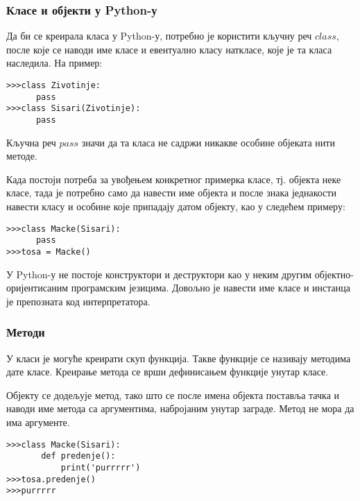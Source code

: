 \subsubsection{Класе и објекти у Python-у}

Да би се креирала класа у Python-у, потребно је користити кључну реч $class$, после које се наводи име класе и евентуално класу наткласе, које је та класа наследила. На пример:

\begin{lstlisting}[caption=Дефинисање класа, label=class]
>>>class Zivotinje:
      pass
>>>class Sisari(Zivotinje):
      pass
\end{lstlisting}

Кључна реч $pass$ значи да та класа не садржи никакве особине објеката нити методе.

Када постоји потреба за увођењем конкретног примерка класе, тј. објекта неке класе, тада је потребно само да навести име објекта и после знака једнакости навести класу и особине које припадају датом објекту, као у следећем примеру:

\begin{lstlisting}[caption=Креирање објекта, label=objects]
>>>class Macke(Sisari):
      pass
>>>tosa = Macke()
\end{lstlisting}

У Python-у не постоје конструктори и деструктори као у неким другим објектно- оријентисаним програмским језицима. Довољно је навести име класе и инстанца је препозната код интерпретатора.

\subsubsection{Методи}

У класи је могуће креирати скуп функција. Такве функције се називају методима дате класе. Креирање метода се врши дефинисањем функције унутар класе.

Објекту се додељује метод, тако што се после имена објекта поставља тачка и наводи име метода са аргументима, набројаним унутар заграде. Метод не мора да има аргументе.

\begin{lstlisting}[caption= Методи класе, label=method]
>>>class Macke(Sisari):
       def predenje():
           print('purrrrr')
>>>tosa.predenje()
>>>purrrrr
\end{lstlisting}
